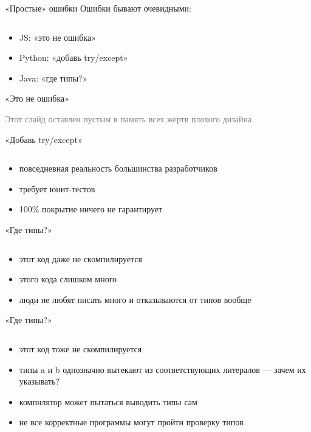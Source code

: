 \documentclass[10pt]{beamer}
\newcommand{\light}[1]{\textcolor{gray}{\footnotesize{#1}}}
\newcommand{\code}[4]{\inputminted[linenos, frame=none, firstline=#2, lastline=#3,
  framesep=10pt, bgcolor=lightgray]{#4}{#1}}
\begin{document}
\begin{frame}[fragile]{«Простые» ошибки}
  Ошибки бывают очевидными:
  \code{code.py}{1}{3}{python}
  \begin{itemize}
  \item JS: «это не ошибка»
  \item Python: «добавь try/except»
  \item Java: «где типы?»
  \end{itemize}
\end{frame}

\begin{frame}{«Это не ошибка»}
  \begin{center}
    \light{Этот слайд оставлен пустым в память всех жертв плохого дизайна}
  \end{center}
\end{frame}

\begin{frame}{«Добавь try/except»}
  \code{code.py}{5}{10}{python}
  \begin{itemize}
  \item повседневная реальность большинства разработчиков
  \item требует юнит-тестов
  \item 100\% покрытие ничего не гарантирует
  \end{itemize}
\end{frame}

\begin{frame}{«Где типы?»}
  \code{code.java}{1}{7}{java}
  \begin{itemize}
  \item этот код даже не скомпилируется
  \item этого кода слишком много
  \item люди не любят писать много и отказываются от типов вообще
  \end{itemize}
\end{frame}

\begin{frame}{«Где типы?»}
  \code{code.hs}{1}{3}{haskell}
  \begin{itemize}
  \item этот код тоже не скомпилируется
  \item типы a и b однозначно вытекают из соответствующих литералов — зачем их указывать?
  \item компилятор может пытаться выводить типы сам
  \item не все корректные программы могут пройти проверку типов
  \end{itemize}
\end{frame}
\end{document}
